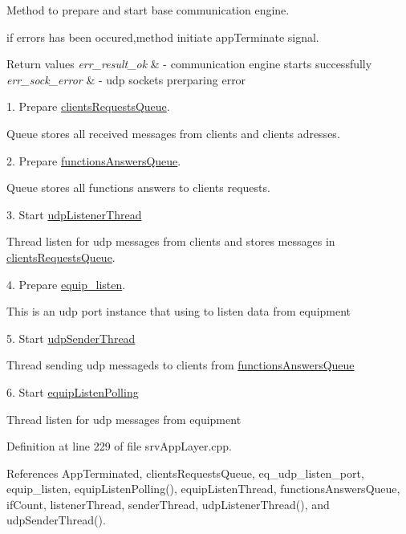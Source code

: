 Method to prepare and start base communication engine. 

if errors has been occured,method initiate appTerminate signal. 
\begin{DoxyRetVals}{Return values}
{\em err\_\-result\_\-ok} & -\/ communication engine starts successfully \\
\hline
{\em err\_\-sock\_\-error} & -\/ udp sockets prerparing error \\
\hline
\end{DoxyRetVals}


1. Prepare \hyperlink{classsrvAppLayer_a79e7499e8647eb0f0ba4fd9613fd48c0}{clientsRequestsQueue}.

Queue stores all received messages from clients and clients adresses.

2. Prepare \hyperlink{classsrvAppLayer_a6c6ddd6197dc92d2812ed3de418e4b5e}{functionsAnswersQueue}.

Queue stores all functions answers to clients requests.

3. Start \hyperlink{srvAppLayer_8cpp_a730236a494d356798212190aae12f103}{udpListenerThread}

Thread listen for udp messages from clients and stores messages in \hyperlink{classsrvAppLayer_a79e7499e8647eb0f0ba4fd9613fd48c0}{clientsRequestsQueue}.

4. Prepare \hyperlink{classsrvAppLayer_af96e38bd128f37b4facc0957c31ae6ac}{equip\_\-listen}.

This is an udp port instance that using to listen data from equipment

5. Start \hyperlink{srvAppLayer_8cpp_a7eaf60b2d51988d305e9c8a4f7497b83}{udpSenderThread}

Thread sending udp messageds to clients from \hyperlink{classsrvAppLayer_a6c6ddd6197dc92d2812ed3de418e4b5e}{functionsAnswersQueue}

6. Start \hyperlink{commonFuncsMgr_8h_abd797e5a8e26768954fb1eb1c3621437}{equipListenPolling}

Thread listen for udp messages from equipment 



Definition at line 229 of file srvAppLayer.cpp.



References AppTerminated, clientsRequestsQueue, eq\_\-udp\_\-listen\_\-port, equip\_\-listen, equipListenPolling(), equipListenThread, functionsAnswersQueue, ifCount, listenerThread, senderThread, udpListenerThread(), and udpSenderThread().



